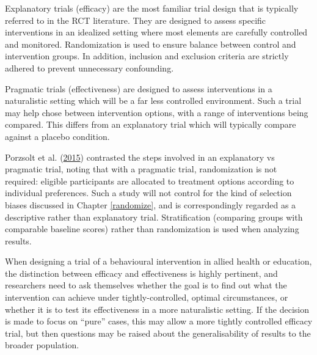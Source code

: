 \documentclass{krantz}
\begin{document}
Explanatory trials (efficacy) are the most familiar trial design that is typically referred to in the RCT literature. They are designed to assess specific interventions in an idealized setting where most elements are carefully controlled and monitored. Randomization is used to ensure balance between control and intervention groups. In addition, inclusion and exclusion criteria are strictly adhered to prevent unnecessary confounding.

Pragmatic trials (effectiveness) are designed to assess interventions in a naturalistic setting which will be a far less controlled environment. Such a trial may help chose between intervention options, with a range of interventions being compared. This differs from an explanatory trial which will typically compare against a placebo condition.

Porzsolt et al. (\protect\hyperlink{ref-porzsolt2015}{2015}) contrasted the steps involved in an explanatory vs pragmatic trial, noting that with a pragmatic trial, randomization is not required: eligible participants are allocated to treatment options according to individual preferences. Such a study will not control for the kind of selection biases discussed in Chapter \ref{randomize}, and is correspondingly regarded as a descriptive rather than explanatory trial. Stratification (comparing groups with comparable baseline scores) rather than randomization is used when analyzing results.

When designing a trial of a behavioural intervention in allied health or education, the distinction between efficacy and effectiveness is highly pertinent, and researchers need to ask themselves whether the goal is to find out what the intervention can achieve under tightly-controlled, optimal circumstances, or whether it is to test its effectiveness in a more naturalistic setting. If the decision is made to focus on ``pure'' cases, this may allow a more tightly controlled efficacy trial, but then questions may be raised about the generalisability of results to the broader population.
\end{document}
